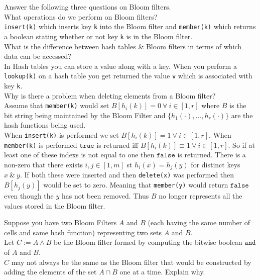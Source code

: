 \documentclass[11pt,a4paper]{article}
\begin{document}
\question
Answer the following three questions on Bloom filters.\\

\qpartnb What operations do we perform on Bloom filters?\\

\apart
\lstinline!insert(k)! which inserts key \lstinline!k! into the Bloom filter and \lstinline!member(k)! which returns a boolean stating whether or not key \lstinline!k! is in the Bloom filter.\\

\qpartnb What is the difference between hash tables \& Bloom filters in terms of which data can be accessed?\\

\apart
In Hash tables you can store a value along with a key. When you perform a \lstinline!lookup(k)! on a hash table you get returned the value \lstinline!v! which is associated with key \lstinline!k!.\\

\qpartnb Why is there a problem when deleting elements from a Bloom filter?\\

\apart
Assume that \lstinline!member(k)! would set $B[h_i(k)]=0\ \forall\ i\in[1,r]$ where $B$ is the bit string being maintained by the Bloom Filter and $\{h_1(\cdot),\dots,h_r(\cdot)\}$ are the hash functions being used.\\
When \lstinline!insert(k)! is performed we set $B[h_i(k)]=1\ \forall\ i\in[1,r]$. When \lstinline!member(k)! is performed $\mathtt{true}$ is returned iff $B[h_i(k)]\equiv1\ \forall\ i\in[1,r]$. So if at least one of these indexs is not equal to one then $\mathtt{false}$ is returned. There is a non-zero that there exists $i,j\in[1,m]$ st $h_i(x)=h_j(y)$ for distinct keys $x\ \&\ y$. If both these were inserted and then \lstinline!delete(x)! was performed then $B[h_j(y)]$ would be set to zero. Meaning that \lstinline!member(y)! would return $\mathtt{false}$ even though the $y$ has not been removed. Thus $B$ no longer represents all the values stored in the Bloom filter.

\question
Suppose you have two Bloom Filters $A$ and $B$ (each having the same number of cells and same hash function) representing two sets $A$ and $B$.\\
Let $C:=A\wedge B$ be the Bloom filter formed by computing the bitwise boolean $\mathtt{and}$ of $A$ and $B$.\\

\qpart
$C$ may not always be the same as the Bloom filter that would be constructed by adding the elements of the set $A\cap B$ one at a time. Explain why.\\
\end{document}
